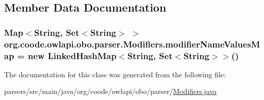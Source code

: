 \subsection{Member Data Documentation}
\hypertarget{classorg_1_1coode_1_1owlapi_1_1obo_1_1parser_1_1_modifiers_a9efaddeac98bca8ede138655ee75043b}{
\subsubsection[{modifier\-Name\-Values\-Map}]{\setlength{\rightskip}{0pt plus 5cm}Map$<$String, Set$<$String$>$ $>$ org.\-coode.\-owlapi.\-obo.\-parser.\-Modifiers.\-modifier\-Name\-Values\-Map = new Linked\-Hash\-Map$<$String, Set$<$String$>$$>$()\hspace{0.3cm}{\ttfamily [private]}}}\label{classorg_1_1coode_1_1owlapi_1_1obo_1_1parser_1_1_modifiers_a9efaddeac98bca8ede138655ee75043b}


The documentation for this class was generated from the following file\-:\begin{DoxyCompactItemize}
\item 
parsers/src/main/java/org/coode/owlapi/obo/parser/\hyperlink{_modifiers_8java}{Modifiers.\-java}\end{DoxyCompactItemize}
